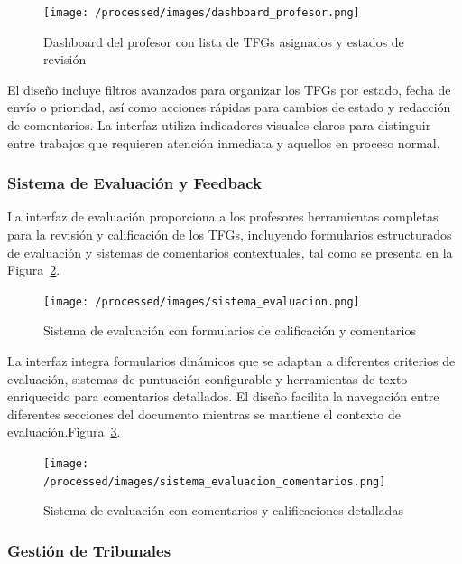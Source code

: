 \documentclass[12pt,a4paper,oneside]{report}
\begin{document}
\begin{figure}[H]
\centering
\texttt{[image: /processed/images/dashboard\_profesor.png]}
\caption{Dashboard del profesor con lista de TFGs asignados y estados de revisión}
\label{fig:dashboard-profesor}
\end{figure}

El diseño incluye filtros avanzados para organizar los TFGs por estado, fecha de envío o prioridad, así como acciones rápidas para cambios de estado y redacción de comentarios. La interfaz utiliza indicadores visuales claros para distinguir entre trabajos que requieren atención inmediata y aquellos en proceso normal.

\subsubsection{Sistema de Evaluación y Feedback}\label{sistema-de-evaluacion-y-feedback}

La interfaz de evaluación proporciona a los profesores herramientas completas para la revisión y calificación de los TFGs, incluyendo formularios estructurados de evaluación y sistemas de comentarios contextuales, tal como se presenta en la Figura~\ref{fig:sistema-evaluacion}.

\begin{figure}[H]
\centering
\texttt{[image: /processed/images/sistema\_evaluacion.png]}
\caption{Sistema de evaluación con formularios de calificación y comentarios}
\label{fig:sistema-evaluacion}
\end{figure}

La interfaz integra formularios dinámicos que se adaptan a diferentes criterios de evaluación, sistemas de puntuación configurable y herramientas de texto enriquecido para comentarios detallados. El diseño facilita la navegación entre diferentes secciones del documento mientras se mantiene el contexto de evaluación.Figura~\ref{fig:sistema-evaluacion-comentarios}.

\begin{figure}[H]
\centering
\texttt{[image: /processed/images/sistema\_evaluacion\_comentarios.png]}
\caption{Sistema de evaluación con comentarios y calificaciones detalladas}
\label{fig:sistema-evaluacion-comentarios}
\end{figure}

\subsubsection{Gestión de Tribunales}\label{gestion-de-tribunales}
\end{document}
